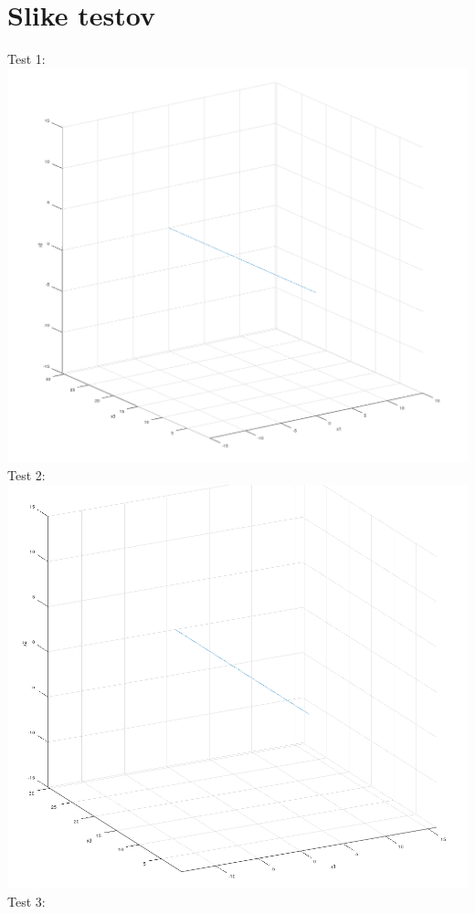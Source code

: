\documentclass[12pt, letterpaper, twoside]{article}    %
\begin{document}
\section{Slike testov}
Test 1: \\
\includegraphics[width=\textwidth]{test1}
\newpage
Test 2: \\
\includegraphics[width=\textwidth]{test2}
\newpage
Test 3: \\
\end{document}
